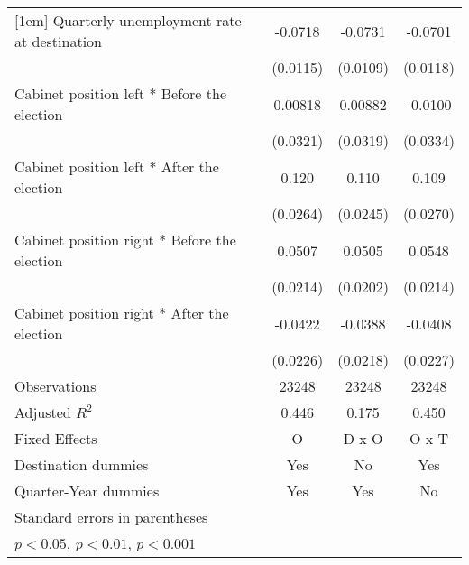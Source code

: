 \begin{table}[htbp]
\begin{tabular}{l*{3}{c}}
[1em]
Quarterly unemployment rate at destination&     -0.0718\sym{***}&     -0.0731\sym{***}&     -0.0701\sym{***}\\
                    &    (0.0115)         &    (0.0109)         &    (0.0118)         \\
[1em]
Cabinet position left * Before the election&     0.00818         &     0.00882         &     -0.0100         \\
                    &    (0.0321)         &    (0.0319)         &    (0.0334)         \\
[1em]
Cabinet position left * After the election&       0.120\sym{***}&       0.110\sym{***}&       0.109\sym{***}\\
                    &    (0.0264)         &    (0.0245)         &    (0.0270)         \\
[1em]
Cabinet position right * Before the election&      0.0507\sym{*}  &      0.0505\sym{*}  &      0.0548\sym{*}  \\
                    &    (0.0214)         &    (0.0202)         &    (0.0214)         \\
[1em]
Cabinet position right * After the election&     -0.0422         &     -0.0388         &     -0.0408         \\
                    &    (0.0226)         &    (0.0218)         &    (0.0227)         \\
\hline
Observations        &       23248         &       23248         &       23248         \\
Adjusted \(R^{2}\)  &       0.446         &       0.175         &       0.450         \\
Fixed Effects       &           O         &       D x O         &       O x T         \\
Destination dummies &         Yes         &          No         &         Yes         \\
Quarter-Year dummies&         Yes         &         Yes         &          No         \\
\hline\hline
\multicolumn{4}{l}{\footnotesize Standard errors in parentheses}\\
\multicolumn{4}{l}{\footnotesize \sym{*} \(p<0.05\), \sym{**} \(p<0.01\), \sym{***} \(p<0.001\)}\\
\end{tabular}
\end{table}
